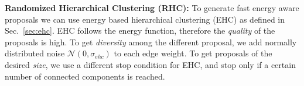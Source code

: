 \documentclass[10pt,twocolumn,letterpaper]{article}
\DeclareMathOperator*{\argmin}{arg\,min}
\DeclareMathOperator*{\argmax}{arg\,max}
\theoremstyle{definition}
\begin{document}
%



\noindent \textbf{Randomized Hierarchical Clustering (RHC):}
%
To generate fast energy aware proposals we can use energy
based hierarchical clustering (EHC) as defined in Sec.~\ref{sec:ehc}.
EHC follows the energy function, therefore the \emph{quality}
of the proposals is high.
To get \emph{diversity} among the different proposal,
we add normally distributed noise  $\mathcal{N}(0, \sigma_{ehc})$
to each edge weight.
To get proposals of the desired \emph{size}, we use a
different stop condition for EHC, and stop only if a certain number of connected
components is reached.
\end{document}
